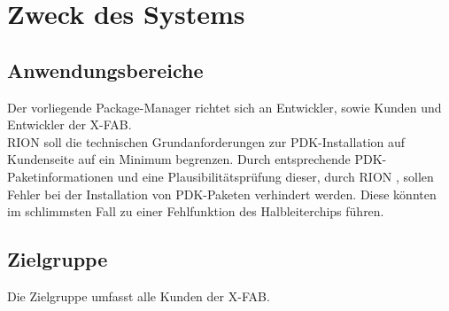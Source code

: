 \chapter{Zweck des Systems}

\section{Anwendungsbereiche}
Der vorliegende Package-Manager richtet sich an Entwickler, sowie Kunden und Entwickler der X-FAB. \\
RION soll die technischen Grundanforderungen zur PDK-Installation auf Kundenseite auf ein Minimum begrenzen. Durch entsprechende PDK-Paketinformationen und eine Plausibilitätsprüfung dieser, durch RION , sollen Fehler bei der Installation von PDK-Paketen verhindert werden. Diese könnten im schlimmsten Fall zu einer Fehlfunktion des Halbleiterchips führen.

\section{Zielgruppe}
Die Zielgruppe umfasst alle Kunden der X-FAB.

